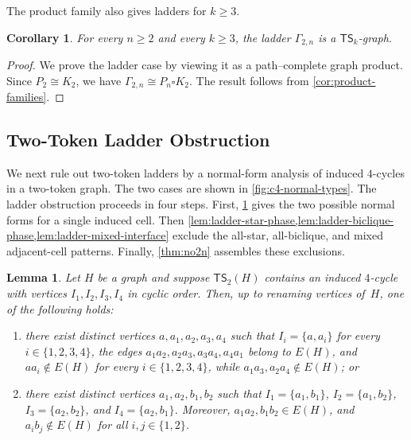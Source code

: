 \documentclass[a4paper]{article}
\theoremstyle{plain}
\newtheorem{corollary}[corollary]{Corollary}
\newtheorem{lemma}[lemma]{Lemma}
\theoremstyle{definition}
\newcommand{\TSsym}{\mathsf{TS}}
\numberwithin{equation}{section}
\begin{document}
The product family also gives ladders for $k\ge 3$.

\begin{corollary}
\label{cor:ladder-kge3}
For every $n\ge 2$ and every $k\ge 3$, the ladder $\Gamma_{2,n}$ is a $\TSsym_k$-graph.
\end{corollary}

\begin{proof}
We prove the ladder case by viewing it as a path--complete graph product.
Since $P_2\cong K_2$, we have $\Gamma_{2,n}\cong P_n\square K_2$.
The result follows from \cref{cor:product-families}.
\end{proof}

\subsection{Two-Token Ladder Obstruction}

We next rule out two-token ladders by a normal-form analysis of induced $4$-cycles in a two-token graph.
The two cases are shown in \cref{fig:c4-normal-types}.
The ladder obstruction proceeds in four steps.
First, \cref{lem:c4-normal} gives the two possible normal forms for a single induced cell.
Then \cref{lem:ladder-star-phase,lem:ladder-biclique-phase,lem:ladder-mixed-interface} exclude the all-star, all-biclique, and mixed adjacent-cell patterns.
Finally, \cref{thm:no2n} assembles these exclusions.

\begin{lemma}
\label{lem:c4-normal}
Let $H$ be a graph and suppose $\TSsym_2(H)$ contains an induced $4$-cycle with vertices $I_1,I_2,I_3,I_4$ in cyclic order.
Then, up to renaming vertices of~$H$, one of the following holds:
\begin{enumerate}[label=\textup{(\alph*)}]
\item there exist distinct vertices $a,a_1,a_2,a_3,a_4$ such that $I_i=\{a,a_i\}$ for every $i\in\{1,2,3,4\}$, the edges $a_1a_2,a_2a_3,a_3a_4,a_4a_1$ belong to $E(H)$, and $aa_i\notin E(H)$ for every $i\in\{1,2,3,4\}$, while $a_1a_3,a_2a_4\notin E(H)$; or
\item there exist distinct vertices $a_1,a_2,b_1,b_2$ such that $I_1=\{a_1,b_1\}$, $I_2=\{a_1,b_2\}$, $I_3=\{a_2,b_2\}$, and $I_4=\{a_2,b_1\}$.
Moreover, $a_1a_2,b_1b_2\in E(H)$, and $a_i b_j\notin E(H)$ for all $i,j\in\{1,2\}$.
\end{enumerate}
\end{lemma}
\end{document}
